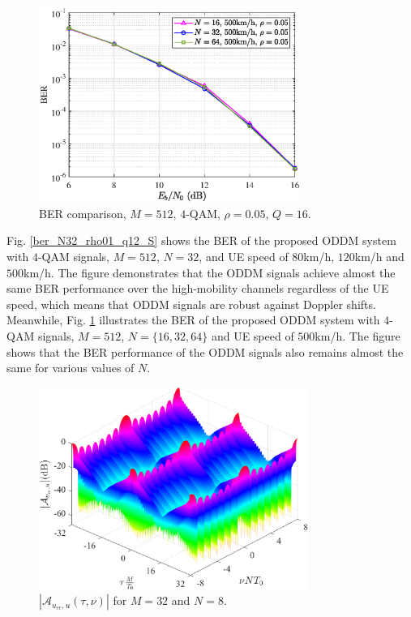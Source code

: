 \documentclass[journal]{IEEEtran}
\begin{document}
{\begin{figure}
  \centering
  \includegraphics[width=8.5cm]{ber_vs_N.eps}
  \caption{BER comparison, $M=512$, $4$-QAM, $\rho=0.05$, $Q=16$.}
  \label{ber_S500_rho01_q12_N}
   \vspace*{-3.2mm}
\end{figure}



Fig. \ref{ber_N32_rho01_q12_S}  shows the BER of the proposed ODDM system
with $4$-QAM signals, $M= 512$, $N= 32$, and UE speed of $80$km/h, $120$km/h and $500$km/h. 
The figure demonstrates that the ODDM signals achieve almost the same BER performance over the high-mobility channels regardless of the UE speed, which means that ODDM signals are robust against Doppler shifts.
Meanwhile, Fig. \ref{ber_S500_rho01_q12_N}  illustrates the BER of the proposed ODDM system
with $4$-QAM signals, $M= 512$, $N= \{16, 32, 64\}$ and UE speed of $500$km/h. 
{The figure shows that the BER performance of the ODDM signals also remains almost the same for various values of $N$.}


\begin{figure}
  \centering
  \includegraphics[width=8.8cm]{ambiguity_3d_new}
  \caption{$\left|\mathcal A_{u_{ce},u}\left(\tau,\nu\right)\right|$ for $M=32$ and $N=8$.}
  \label{as}


\end{figure}}
\end{document}
